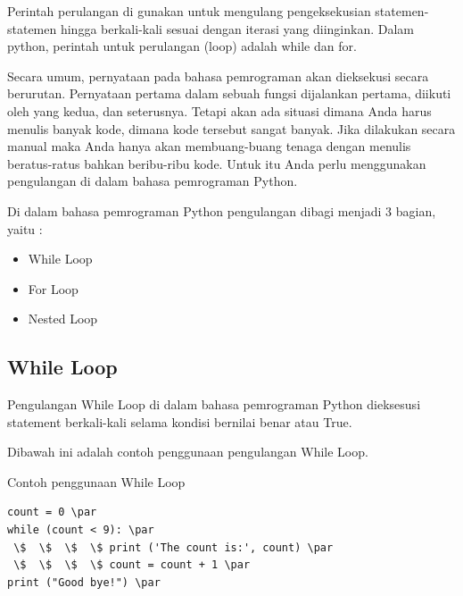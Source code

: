 Perintah perulangan di gunakan untuk mengulang pengeksekusian statemen-statemen hingga
berkali-kali sesuai dengan iterasi yang diinginkan. Dalam python, perintah untuk perulangan (loop)
adalah while dan for.

Secara umum, pernyataan pada bahasa pemrograman akan dieksekusi secara berurutan. Pernyataan pertama dalam sebuah fungsi dijalankan pertama, diikuti oleh yang kedua, dan seterusnya. Tetapi akan ada situasi dimana Anda harus menulis banyak kode, dimana kode tersebut sangat banyak. Jika dilakukan secara manual maka Anda hanya akan membuang-buang tenaga dengan menulis beratus-ratus bahkan beribu-ribu kode. Untuk itu Anda perlu menggunakan pengulangan di dalam bahasa pemrograman Python. \par

Di dalam bahasa pemrograman Python pengulangan dibagi menjadi 3 bagian, yaitu : 
\begin{itemize}
\item
While Loop 
\item
For Loop 
\item
Nested Loop 
\end{itemize} 
\vspace{\baselineskip}
\vspace{\baselineskip}
\vspace{12pt}


\subsection{While Loop}
Pengulangan While Loop di dalam bahasa pemrograman Python dieksesusi statement berkali-kali selama kondisi bernilai benar atau True. \par
\vspace{\baselineskip}
\vspace{\baselineskip}
Dibawah ini adalah contoh penggunaan pengulangan While Loop. \par
\vspace{\baselineskip}
\vspace{12pt}
Contoh penggunaan While Loop \par
\vspace{\baselineskip}
\vspace{\baselineskip}
\begin{verbatim}
count = 0 \par
while (count < 9): \par
 \$  \$  \$  \$ print ('The count is:', count) \par
 \$  \$  \$  \$ count = count + 1 \par
print ("Good bye!") \par
\end{verbatim}
\vspace{\baselineskip}
\vspace{\baselineskip}
\vspace{\baselineskip}
\vspace{12pt}

